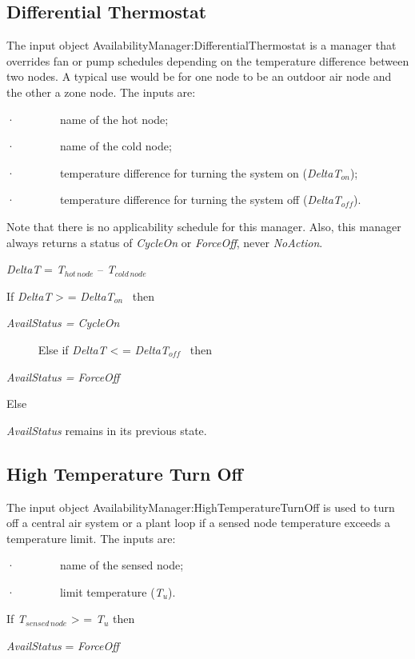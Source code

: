 \subsection{Differential Thermostat}\label{differential-thermostat}

The input object AvailabilityManager:DifferentialThermostat is a manager that overrides fan or pump schedules depending on the temperature difference between two nodes. A typical use would be for one node to be an outdoor air node and the other a zone node. The inputs are:

·~~~~~~~~name of the hot node;

·~~~~~~~~name of the cold node;

·~~~~~~~~temperature difference for turning the system on (\emph{DeltaT\(_{on}\)});

·~~~~~~~~temperature difference for turning the system off (\emph{DeltaT\(_{off}\)}).

Note that there is no applicability schedule for this manager. Also, this manager always returns a status of \emph{CycleOn} or \emph{ForceOff}, never \emph{NoAction}.

\emph{DeltaT} = \emph{T\(_{hot\, node}\)} -- \emph{T\(_{cold\, node}\)}

If \emph{DeltaT} \textgreater{} = \emph{DeltaT\(_{on}\)} ~then

\emph{AvailStatus = CycleOn}

~ ~~~~Else if \emph{DeltaT} \textless{} = \emph{DeltaT\(_{off}\)} ~then

\emph{AvailStatus = ForceOff}

Else

\emph{AvailStatus} remains in its previous state.

\subsection{High Temperature Turn Off}\label{high-temperature-turn-off}

The input object AvailabilityManager:HighTemperatureTurnOff is used to turn off a central air system or a plant loop if a sensed node temperature exceeds a temperature limit. The inputs are:

·~~~~~~~~name of the sensed node;

·~~~~~~~~limit temperature (\emph{T\(_{u}\)}).

If \emph{T\(_{sensed\, node}\)} \textgreater{} = \emph{T\(_{u}\)} then

\emph{AvailStatus} = \emph{ForceOff}

